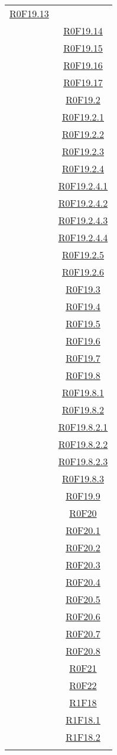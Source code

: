 \documentclass[../AnalisiDeiRequisiti.tex]{subfiles}
\begin{document}
\begin{longtable}{|c|c|}
\hyperlink{R0F19.13}{R0F19.13}\\& \hyperlink{R0F19.14}{R0F19.14}\\& \hyperlink{R0F19.15}{R0F19.15}\\& \hyperlink{R0F19.16}{R0F19.16}\\& \hyperlink{R0F19.17}{R0F19.17}\\& \hyperlink{R0F19.2}{R0F19.2}\\& \hyperlink{R0F19.2.1}{R0F19.2.1}\\& \hyperlink{R0F19.2.2}{R0F19.2.2}\\& \hyperlink{R0F19.2.3}{R0F19.2.3}\\& \hyperlink{R0F19.2.4}{R0F19.2.4}\\& \hyperlink{R0F19.2.4.1}{R0F19.2.4.1}\\& \hyperlink{R0F19.2.4.2}{R0F19.2.4.2}\\& \hyperlink{R0F19.2.4.3}{R0F19.2.4.3}\\& \hyperlink{R0F19.2.4.4}{R0F19.2.4.4}\\& \hyperlink{R0F19.2.5}{R0F19.2.5}\\& \hyperlink{R0F19.2.6}{R0F19.2.6}\\& \hyperlink{R0F19.3}{R0F19.3}\\& \hyperlink{R0F19.4}{R0F19.4}\\& \hyperlink{R0F19.5}{R0F19.5}\\& \hyperlink{R0F19.6}{R0F19.6}\\& \hyperlink{R0F19.7}{R0F19.7}\\& \hyperlink{R0F19.8}{R0F19.8}\\& \hyperlink{R0F19.8.1}{R0F19.8.1}\\& \hyperlink{R0F19.8.2}{R0F19.8.2}\\& \hyperlink{R0F19.8.2.1}{R0F19.8.2.1}\\& \hyperlink{R0F19.8.2.2}{R0F19.8.2.2}\\& \hyperlink{R0F19.8.2.3}{R0F19.8.2.3}\\& \hyperlink{R0F19.8.3}{R0F19.8.3}\\& \hyperlink{R0F19.9}{R0F19.9}\\& \hyperlink{R0F20}{R0F20}\\& \hyperlink{R0F20.1}{R0F20.1}\\& \hyperlink{R0F20.2}{R0F20.2}\\& \hyperlink{R0F20.3}{R0F20.3}\\& \hyperlink{R0F20.4}{R0F20.4}\\& \hyperlink{R0F20.5}{R0F20.5}\\& \hyperlink{R0F20.6}{R0F20.6}\\& \hyperlink{R0F20.7}{R0F20.7}\\& \hyperlink{R0F20.8}{R0F20.8}\\& \hyperlink{R0F21}{R0F21}\\& \hyperlink{R0F22}{R0F22}\\& \hyperlink{R1F18}{R1F18}\\& \hyperlink{R1F18.1}{R1F18.1}\\& \hyperlink{R1F18.2}{R1F18.2}\\& 
\end{longtable}
\end{document}
